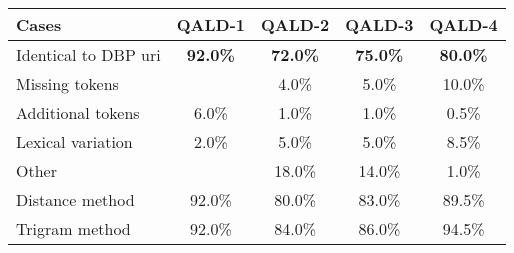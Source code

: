 {\centering
\begin{tabular}{l|c|c|c|c}
\textbf{Cases}  & \textbf{QALD-1} & \textbf{QALD-2} & \textbf{QALD-3} & \textbf{QALD-4} \\ \hline \hline
Identical to DBP uri   & \textbf{92.0\%}  & \textbf{72.0\%}  & \textbf{75.0\%}  & \textbf{80.0\%}  \\ \hline
Missing tokens         &                  & 4.0\%            & 5.0\%            & 10.0\%           \\ \hline
Additional tokens      & 6.0\%            & 1.0\%            & 1.0\%            & 0.5\%            \\ \hline
Lexical variation      & 2.0\%            & 5.0\%            & 5.0\%            & 8.5\%            \\ \hline
Other                  &                  & 18.0\%           & 14.0\%           & 1.0\%            \\ \hline \hline
Distance method        & 92.0\%           & 80.0\%           & 83.0\%           & 89.5\%           \\ \hline
Trigram method         & 92.0\%           & 84.0\%           & 86.0\%           & 94.5\%           \\ \hline
\end{tabular}
}
